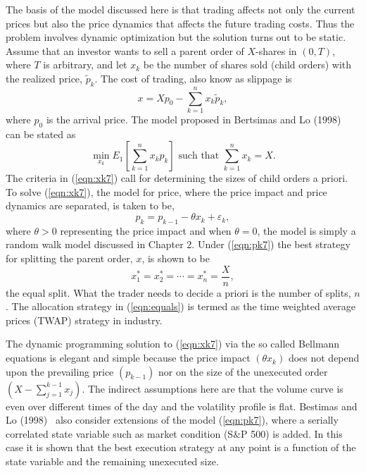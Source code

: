 The basis of the model discussed here is that trading affects not only the current prices but also the price dynamics that affects the future trading costs. Thus the problem involves dynamic optimization but the solution turns out to be static. Assume that an investor wants to sell a parent order of $X$-shares in $(0,T)$, where $T$ is arbitrary, and let $x_k$ be the number of shares sold (child orders) with the realized price, $\widetilde{p}_k$. The cost of trading, also know as slippage is
	\begin{equation}\label{eqn:x7}
	x = Xp_0 - \sum_{k=1}^n x_k\widetilde{p}_k,
	\end{equation}
where $p_0$ is the arrival price. The model proposed in Bertsimas and Lo (1998)~\cite{berlo} can be stated as
	\begin{equation}\label{eqn:xk7}
	\min_{x_k} E_1 \left[\sum_{k=1}^n x_kp_k\right] \text{ such that }\sum_{k=1}^n x_k=X.
	\end{equation}
The criteria in (\ref{eqn:xk7}) call for determining the sizes of child orders a priori. To solve (\ref{eqn:xk7}), the model for price, where the price impact and price dynamics are separated, is taken to be,
	\begin{equation}\label{eqn:pk7}
	p_k = p_{k-1} - \theta x_k + \varepsilon_k,
	\end{equation}
where $\theta > 0$ representing the price impact and when $\theta = 0$, the model is simply a random walk model discussed in Chapter 2. Under (\ref{eqn:pk7}) the best strategy for splitting the parent order, $x$, is shown to be
	\begin{equation}\label{eqn:equals}
	x_1^* = x_2^* = \cdots = x_n^* = \frac{X}{n},
	\end{equation}
the equal split. What the trader needs to decide a priori is the number of splits, $n$. The allocation strategy in (\ref{eqn:equals}) is termed as the time weighted average prices (TWAP) strategy in industry. 


The dynamic programming solution to (\ref{eqn:xk7}) via the so called Bellmann equations is elegant and simple because the price impact $(\theta x_k)$ does not depend upon the prevailing price $(p_{k-1})$ nor on the size of the unexecuted order $(X - \sum_{j=1}^{k-1} x_j)$. The indirect assumptions here are that the volume curve is even over different times of the day and the volatility profile is flat. Bestimas and Lo (1998)~\cite{berlo} also consider extensions of the model (\ref{eqn:pk7}), where a serially correlated state variable such as market condition (S\&P 500) is added. In this case it is shown that the best execution strategy at any point is a function of the state variable and the remaining unexecuted size. 


